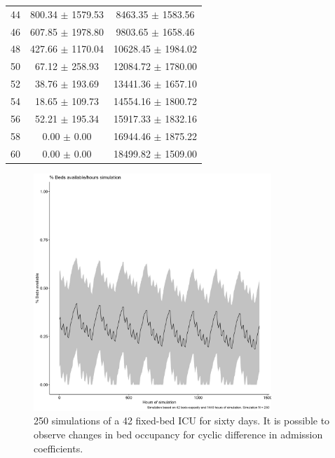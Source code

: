 \documentclass[12pt]{article}
\begin{document}
\begin{table}[H]
\begin{tabular}{ccc}
44 & 800.34 $\pm$ 1579.53 & 8463.35 $\pm$ 1583.56 \\
46 & 607.85 $\pm$ 1978.80 & 9803.65 $\pm$ 1658.46 \\
48 & 427.66 $\pm$ 1170.04 & 10628.45 $\pm$ 1984.02 \\
50 & 67.12 $\pm$ 258.93 & 12084.72 $\pm$ 1780.00 \\
52 & 38.76 $\pm$ 193.69 & 13441.36 $\pm$ 1657.10 \\
54 & 18.65 $\pm$ 109.73 & 14554.16 $\pm$ 1800.72 \\
56 & 52.21 $\pm$ 195.34 & 15917.33 $\pm$ 1832.16 \\
58 & 0.00 $\pm$ 0.00 & 16944.46 $\pm$ 1875.22 \\
60 & 0.00 $\pm$ 0.00 & 18499.82 $\pm$ 1509.00 \\
\hline
\end{tabular}
\end{table}

\begin{figure}[H]
\centering
\includegraphics[width=0.8\textwidth]{Image3.jpeg}
\caption{250 simulations of a 42 fixed-bed ICU for sixty days. It is possible to observe changes in bed occupancy for cyclic difference in admission coefficients.}
\label{fig:42bedsSimulation}
\end{figure}
\end{document}
